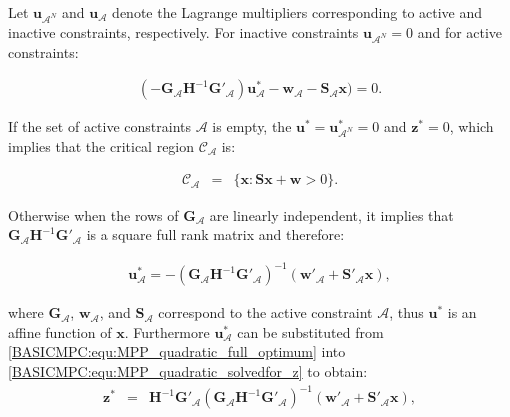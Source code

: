     Let $\textbf{u}_{\mathcal{A}^N}$ and $\textbf{u}_{\mathcal{A}}$ denote the Lagrange multipliers corresponding to active and inactive constraints, respectively. For inactive constraints $\textbf{u}_{\mathcal{A}^N}=0$ and for active constraints:

    \begin{equation}
    \begin{array}{rcl}
            (-\textbf{G}_{\mathcal{A}}\textbf{H}^{-1}\textbf{G}'_{\mathcal{A}})\textbf{u}^*_{\mathcal{A}}-\textbf{w}_{\mathcal{A}}-\textbf{S}_{\mathcal{A}}\textbf{x})=0.
        \end{array}
        \label{BASICMPC:equ:MPP_quadratic_activeconstr}
    \end{equation}

    If the set of active constraints $\mathcal{A}$ is empty, the $\textbf{u}^*=\textbf{u}^*_{\mathcal{A}^N}=0$ and $\textbf{z}^*=0$, which implies that the critical region $\mathcal{C}_{\mathcal{A}}$ is:

   \begin{equation}
    \begin{array}{rcl}
            \mathcal{C}_{\mathcal{A}}&=&\{\textbf{x}:\textbf{Sx}+\textbf{w} > 0 \}.
        \end{array}
        \label{BASICMPC:equ:MPP_quadratic_emptycritical}
    \end{equation}

    Otherwise when the rows of $\textbf{G}_{\mathcal{A}}$ are linearly independent, it implies that $\textbf{G}_{\mathcal{A}}\textbf{H}^{-1}\textbf{G}'_{\mathcal{A}}$ is a square full rank matrix and therefore:

    \begin{equation}
    \begin{array}{rcl}
            \textbf{u}^*_{\mathcal{A}}=-(\textbf{G}_{\mathcal{A}}\textbf{H}^{-1}\textbf{G}'_{\mathcal{A}})^{-1}(\textbf{w}'_{\mathcal{A}}+\textbf{S}'_{\mathcal{A}}\textbf{x}),
        \end{array}
        \label{BASICMPC:equ:MPP_quadratic_full_optimum}
    \end{equation}

    where $\textbf{G}_{\mathcal{A}}$, $\textbf{w}_{\mathcal{A}}$, and $\textbf{S}_{\mathcal{A}}$ correspond to the active constraint $\mathcal{A}$, thus $\textbf{u}^*$ is an affine function of $\textbf{x}$. Furthermore $\textbf{u}^*_{\mathcal{A}}$ can be substituted from \ref{BASICMPC:equ:MPP_quadratic_full_optimum} into \ref{BASICMPC:equ:MPP_quadratic_solvedfor_z} to obtain:
    \begin{equation}
    \begin{array}{rcl}
            \textbf{z}^*&=&\textbf{H}^{-1}\textbf{G}'_{\mathcal{A}}(\textbf{G}_{\mathcal{A}}\textbf{H}^{-1}\textbf{G}'_{\mathcal{A}})^{-1}(\textbf{w}'_{\mathcal{A}}+\textbf{S}'_{\mathcal{A}}\textbf{x}),
        \end{array}
        \label{BASICMPC:equ:MPP_quadratic_full_optimizer}
    \end{equation}

